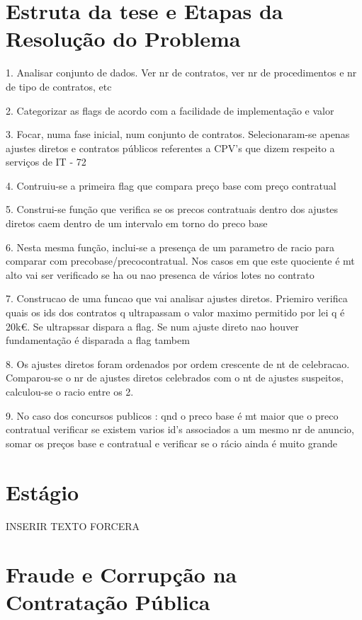 \section{Estruta da tese e   Etapas da Resolução do Problema}

1. Analisar conjunto de dados. Ver nr de contratos, ver nr de procedimentos e nr de tipo de contratos, etc

2. Categorizar as flags de acordo com a facilidade de implementação e valor

3. Focar, numa fase inicial, num conjunto de contratos. Selecionaram-se apenas ajustes diretos e contratos públicos referentes a CPV's que dizem respeito a serviços de IT - 72

4. Contruiu-se a primeira flag que compara preço base com preço contratual 

5. Construi-se função que verifica se os precos contratuais dentro dos ajustes diretos caem dentro de um intervalo em torno do preco base

6. Nesta mesma função, inclui-se a presença de um parametro de racio para comparar com precobase/precocontratual. Nos casos em que este quociente é mt alto vai ser verificado se ha ou nao presenca de vários lotes no contrato

7. Construcao de uma funcao que vai analisar ajustes diretos. Priemiro verifica quais os ids dos contratos q ultrapassam o valor maximo permitido por lei q é 20k€. Se ultrapssar dispara a flag. Se num ajuste direto nao houver fundamentação é disparada a flag tambem

8. Os ajustes diretos foram ordenados por ordem crescente de nt de celebracao. Comparou-se o nr de ajustes diretos celebrados com o nt de ajustes suspeitos, calculou-se o racio entre os 2. 

9. No caso dos concursos publicos : qnd o preco base é mt maior que o preco contratual verificar se existem varios id's associados a um mesmo nr de anuncio, somar os preços base e contratual e verificar se o rácio ainda é muito grande



\section{Estágio}

INSERIR TEXTO FORCERA

\section{Fraude e Corrupção na Contratação Pública}

